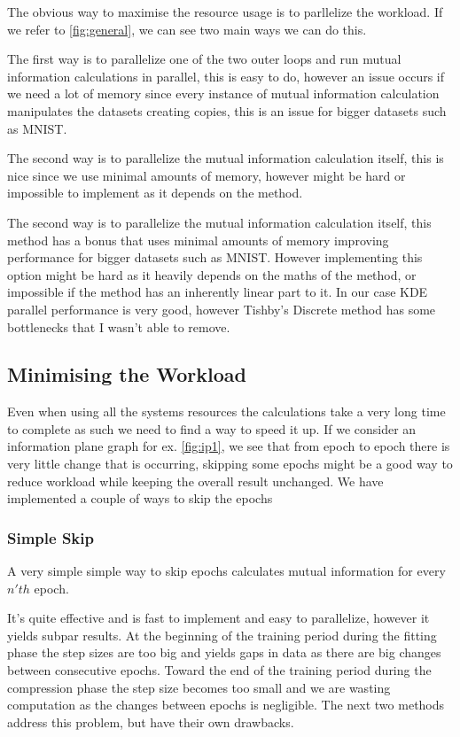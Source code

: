 The obvious way to maximise the resource usage is to parllelize the workload.
If we refer to \autoref{fig:general}, we can see two main ways we can do this.

The first way is to parallelize one of the two outer loops and run mutual
information calculations in parallel, this is easy to do, however an issue
occurs if we need a lot of memory since every instance of mutual information
calculation manipulates the datasets creating copies, this is an issue for
bigger datasets such as MNIST.

The second way is to parallelize the mutual information calculation itself, this
is nice since we use minimal amounts of memory, however might be hard or
impossible to implement as it depends on the method.

The second way is to parallelize the mutual information calculation itself, this
method has a  bonus that uses minimal amounts of memory improving performance
for bigger datasets such as MNIST. However implementing this option might be
hard as it heavily depends on the maths of the method, or impossible if the
method has an inherently linear part to it. In our case KDE parallel performance
is very good, however Tishby's Discrete method has some bottlenecks that I
wasn't able to remove.

\subsection{Minimising the Workload}

Even when using all the systems resources the calculations take a very long
time to complete as such we need to find a way to speed it up. If we consider an
information plane graph for ex. \autoref{fig:ip1}, we see that from epoch to
epoch there is very little change that is occurring, skipping some epochs might
be a good way to reduce workload while keeping the overall result unchanged. We
have implemented a couple of ways to skip the epochs 

\subsubsection{Simple Skip}
  
  A very simple simple way to skip epochs calculates mutual information for
  every $n'th$ epoch.

  It's quite effective and is fast to implement and easy to parallelize, however
  it yields subpar results. At the beginning of the training period during the
  fitting phase the step sizes are too big and yields gaps in data as there are
  big changes between consecutive epochs. Toward the end of the training period
  during the compression phase the step size becomes too small and we are
  wasting computation as the changes between epochs is negligible. The next two
  methods address this problem, but have their own drawbacks.

